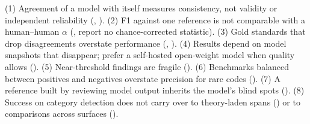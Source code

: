 \begin{notebox}
(1) Agreement of a model with itself measures consistency, not validity or independent reliability (, ). (2) F1 against one reference is not comparable with a human--human $\alpha$ (,  report no chance-corrected statistic). (3) Gold standards that drop disagreements overstate performance (, ). (4) Results depend on model snapshots that disappear; prefer a self-hosted open-weight model when quality allows (). (5) Near-threshold findings are fragile (). (6) Benchmarks balanced between positives and negatives overstate precision for rare codes (). (7) A reference built by reviewing model output inherits the model's blind spots (). (8) Success on category detection does not carry over to theory-laden spans () or to comparisons across surfaces ().
\end{notebox}

